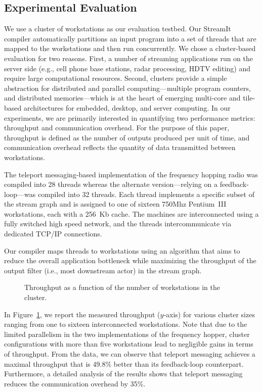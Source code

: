 \subsection{Experimental Evaluation}
\label{sec:evaluation}

We use a cluster of workstations as our evaluation testbed. Our
StreamIt compiler automatically partitions an input program into a set
of threads that are mapped to the workstations and then run concurrently.
We chose a cluster-based evaluation for two reasons. 
First, a number of streaming applications run on the server side
(e.g., cell phone base stations, radar processing, HDTV editing) and
require large computational resources. Second, clusters provide a
simple abstraction for distributed and parallel computing---multiple program
counters, and distributed memories---which 
is at the heart of emerging multi-core and tile-based architectures
for embedded, desktop, and server computing.
In our experiments, we are primarily interested in quantifying two
performance metrics: throughput and communication overhead.
For the purpose of this paper, throughput is defined
as the number of outputs produced per unit of time, and communication
overhead reflects the quantity of data transmitted between
workstations.


The teleport messaging-based implementation of the frequency hopping
radio was compiled into 28 threads
whereas the alternate version---relying on a feedback-loop---was
compiled into 32 threads.  Each thread implements a
specific subset of the stream graph  and is assigned to one of
sixteen 750Mhz Pentium~III workstations, each with a
256~Kb cache.  The machines are interconnected using a fully switched
high speed network, and the threads intercommunicate via
dedicated  TCP/IP connections. 

Our compiler maps threads to workstations using an algorithm that aims
to reduce the overall application bottleneck while
maximizing the throughput of the output filter (i.e., most downstream
actor) in the stream graph.

\begin{figure}[t]
\caption{\small Throughput as a function of the number of workstations
in the cluster. 
\protect\label{fig:fhr-throughput}}
\end{figure}

In Figure~\ref{fig:fhr-throughput}, we report the measured throughput 
($y$-axis) for various cluster sizes ranging from one to sixteen
interconnected workstations. Note that due to the limited parallelism in the
two implementations of the frequency hopper, cluster configurations
with more than five workstations lead to negligible gains in
terms of throughput. From the data, we can observe that teleport
messaging achieves a maximal throughput that is 49.8\% better than its
feedback-loop counterpart. Furthermore, a detailed analysis of the
results shows that teleport messaging reduces the communication
overhead by 35\%.

